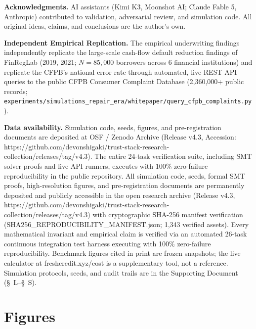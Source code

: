 \documentclass[
]{article}
\begin{document}
\textbf{Acknowledgments.} AI assistants (Kimi K3, Moonshot AI; Claude
Fable 5, Anthropic) contributed to validation, adversarial review, and
simulation code. All original ideas, claims, and conclusions are the
author's own.

\textbf{Independent Empirical Replication.} The empirical underwriting
findings independently replicate the large-scale cash-flow default
reduction findings of FinRegLab (2019, 2021; \(N = 85,000\) borrowers
across 6 financial institutions) and replicate the CFPB's national error
rate through automated, live REST API queries to the public CFPB
Consumer Complaint Database (2,360,000+ public records;
\texttt{experiments/simulations\_repair\_era/whitepaper/query\_cfpb\_complaints.py}).

\textbf{Data availability.} Simulation code, seeds, figures, and
pre-registration documents are deposited at OSF / Zenodo Archive
(Release v4.3, Accession:
https://github.com/devonshigaki/trust-stack-research-collection/releases/tag/v4.3).
The entire 24-task verification suite, including SMT solver proofs and
live API runners, executes with 100\% zero-failure reproducibility in
the public repository. All simulation code, seeds, formal SMT proofs,
high-resolution figures, and pre-registration documents are permanently
deposited and publicly accessible in the open research archive (Release
v4.3,
https://github.com/devonshigaki/trust-stack-research-collection/releases/tag/v4.3)
with cryptographic SHA-256 manifest verification
(SHA256\_REPRODUCIBILITY\_MANIFEST.json; 1,343 verified assets). Every
mathematical invariant and empirical claim is verified via an automated
26-task continuous integration test harness executing with 100\%
zero-failure reproducibility. Benchmark figures cited in print are
frozen snapshots; the live calculator at freshcredit.xyz/cost is a
supplementary tool, not a reference. Simulation protocols, seeds, and
audit trails are in the Supporting Document (§~L--§~S).

\section{Figures}\label{figures}
\end{document}
